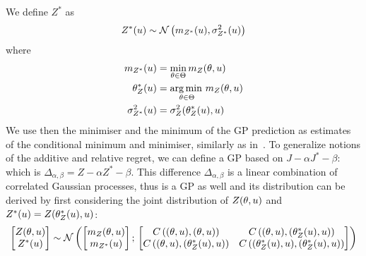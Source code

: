 \documentclass[../../Main_ManuscritThese.tex]{subfiles}
\begin{document}
We define $Z^*$ as
\begin{equation}
  Z^*(u) \sim \mathcal{N}\left(m_{Z^*}(u), \sigma^{2}_{Z^*}(u)\right)
\end{equation}
where
\begin{align}
  m_{Z^*}(u) &= \min_{\theta\in\Theta} m_Z(\theta,u) \label{eq:def_mstar}\\
  \theta_Z^*(u)&=\operatorname*{arg\,min \,}_{\theta\in\Theta} m_Z(\theta, u) \label{eq:theta_star}\\
  \sigma^{2}_{Z^*}(u) &= \sigma^{2}_Z(\theta^*_Z(u), u) \label{eq:sigma_star} 
\end{align}
We use then the minimiser and the minimum of the GP prediction as
estimates of the conditional minimum and minimiser, similarly as
in~\cite{ginsbourger_bayesian_2014}. %
To generalize notions of the additive and relative regret, we can
define a GP based on $J - \alpha J^* - \beta$: which is
$\Delta_{\alpha, \beta} = Z - \alpha Z^* - \beta$.  This difference
$\Delta_{\alpha,\beta}$ is a linear combination of correlated Gaussian
processes, thus is a GP as well and its distribution can be derived by
first considering the joint distribution of $Z(\theta,u)$ and
$Z^*(u) = Z(\theta_Z^*(u), u)$:
\begin{equation}
  \begin{bmatrix}
    Z(\theta,u) \\
    Z^*(u)
  \end{bmatrix}
  \sim \mathcal{N}\left(
    \begin{bmatrix}
      m_Z(\theta,u) \\
      m_{{Z^*}}(u)
    \end{bmatrix}
    ;\,
    \begin{bmatrix}
      C\left((\theta,u),(\theta,u)\right) & C\left((\theta,u),(\theta^*_Z(u),u)\right) \\
      C\left((\theta,u),(\theta_Z^*(u),u)\right) & C\left((\theta^*_Z(u),u),(\theta_Z^*(u),u)\right)
    \end{bmatrix}
  \right)
\end{equation}
\end{document}
